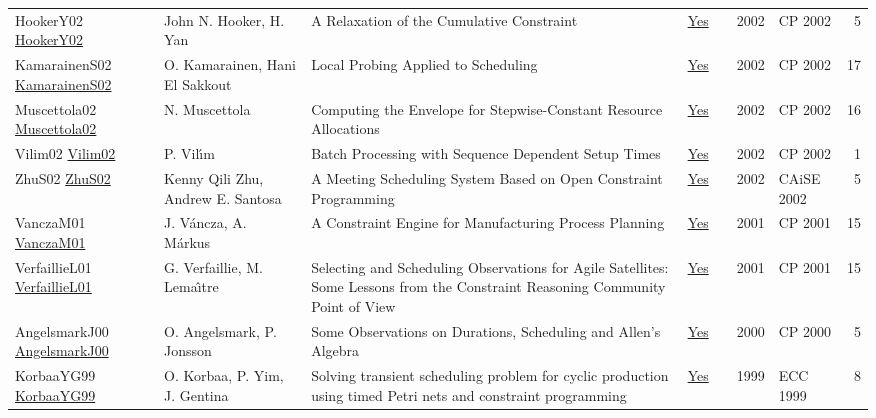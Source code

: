 {\begin{longtable}{p{3cm}p{6cm}p{7cm}rrrp{3cm}r}
HookerY02 \href{https://doi.org/10.1007/3-540-46135-3\_46}{HookerY02} & John N. Hooker, H. Yan & A Relaxation of the Cumulative Constraint & \href{papers/HookerY02.pdf}{Yes} & \cite{HookerY02} & 2002 & CP 2002 & 5\\
KamarainenS02 \href{https://doi.org/10.1007/3-540-46135-3\_11}{KamarainenS02} & O. Kamarainen, Hani El Sakkout & Local Probing Applied to Scheduling & \href{papers/KamarainenS02.pdf}{Yes} & \cite{KamarainenS02} & 2002 & CP 2002 & 17\\
Muscettola02 \href{https://doi.org/10.1007/3-540-46135-3\_10}{Muscettola02} & N. Muscettola & Computing the Envelope for Stepwise-Constant Resource Allocations & \href{papers/Muscettola02.pdf}{Yes} & \cite{Muscettola02} & 2002 & CP 2002 & 16\\
Vilim02 \href{https://doi.org/10.1007/3-540-46135-3\_62}{Vilim02} & P. Vil{\'{\i}}m & Batch Processing with Sequence Dependent Setup Times & \href{papers/Vilim02.pdf}{Yes} & \cite{Vilim02} & 2002 & CP 2002 & 1\\
ZhuS02 \href{https://doi.org/10.1007/3-540-47961-9\_69}{ZhuS02} & Kenny Qili Zhu, Andrew E. Santosa & A Meeting Scheduling System Based on Open Constraint Programming & \href{papers/ZhuS02.pdf}{Yes} & \cite{ZhuS02} & 2002 & CAiSE 2002 & 5\\
VanczaM01 \href{https://doi.org/10.1007/3-540-45578-7\_60}{VanczaM01} & J. V{\'{a}}ncza, A. M{\'{a}}rkus & A Constraint Engine for Manufacturing Process Planning & \href{papers/VanczaM01.pdf}{Yes} & \cite{VanczaM01} & 2001 & CP 2001 & 15\\
VerfaillieL01 \href{https://doi.org/10.1007/3-540-45578-7\_55}{VerfaillieL01} & G. Verfaillie, M. Lema{\^{\i}}tre & Selecting and Scheduling Observations for Agile Satellites: Some Lessons from the Constraint Reasoning Community Point of View & \href{papers/VerfaillieL01.pdf}{Yes} & \cite{VerfaillieL01} & 2001 & CP 2001 & 15\\
AngelsmarkJ00 \href{https://doi.org/10.1007/3-540-45349-0\_35}{AngelsmarkJ00} & O. Angelsmark, P. Jonsson & Some Observations on Durations, Scheduling and Allen's Algebra & \href{papers/AngelsmarkJ00.pdf}{Yes} & \cite{AngelsmarkJ00} & 2000 & CP 2000 & 5\\
KorbaaYG99 \href{https://doi.org/10.23919/ECC.1999.7099947}{KorbaaYG99} & O. Korbaa, P. Yim, J. Gentina & Solving transient scheduling problem for cyclic production using timed Petri nets and constraint programming & \href{papers/KorbaaYG99.pdf}{Yes} & \cite{KorbaaYG99} & 1999 & ECC 1999 & 8\\

\end{longtable}}

